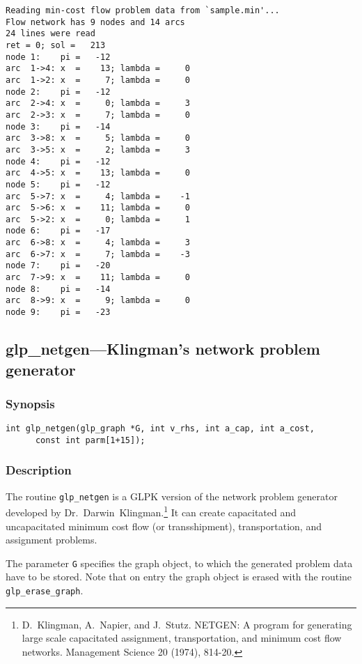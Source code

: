 \begin{verbatim}
Reading min-cost flow problem data from `sample.min'...
Flow network has 9 nodes and 14 arcs
24 lines were read
ret = 0; sol =   213
node 1:    pi =   -12
arc  1->4: x  =    13; lambda =     0
arc  1->2: x  =     7; lambda =     0
node 2:    pi =   -12
arc  2->4: x  =     0; lambda =     3
arc  2->3: x  =     7; lambda =     0
node 3:    pi =   -14
arc  3->8: x  =     5; lambda =     0
arc  3->5: x  =     2; lambda =     3
node 4:    pi =   -12
arc  4->5: x  =    13; lambda =     0
node 5:    pi =   -12
arc  5->7: x  =     4; lambda =    -1
arc  5->6: x  =    11; lambda =     0
arc  5->2: x  =     0; lambda =     1
node 6:    pi =   -17
arc  6->8: x  =     4; lambda =     3
arc  6->7: x  =     7; lambda =    -3
node 7:    pi =   -20
arc  7->9: x  =    11; lambda =     0
node 8:    pi =   -14
arc  8->9: x  =     9; lambda =     0
node 9:    pi =   -23
\end{verbatim}

\newpage

\subsection{glp\_netgen---Klingman's network problem generator}

\subsubsection*{Synopsis}

\begin{verbatim}
int glp_netgen(glp_graph *G, int v_rhs, int a_cap, int a_cost,
      const int parm[1+15]);
\end{verbatim}

\subsubsection*{Description}

The routine \verb|glp_netgen| is a GLPK version of the network problem
generator developed by Dr.~Darwin~Klingman.\footnote{D.~Klingman,
A.~Napier, and J.~Stutz. NETGEN: A program for generating large scale
capacitated assignment, transportation, and minimum cost flow networks.
Management Science 20 (1974), 814-20.} It can create capacitated and
uncapacitated minimum cost flow (or transshipment), transportation, and
assignment problems.

The parameter \verb|G| specifies the graph object, to which the
generated  problem data have to be stored. Note that on entry the graph
object  is erased with the routine \verb|glp_erase_graph|.

